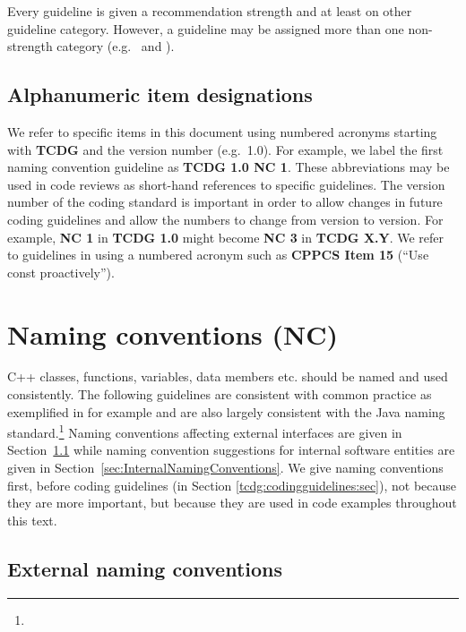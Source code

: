 Every guideline is given a recommendation strength and at least on
other guideline category.  However, a guideline may be assigned more
than one non-strength category (e.g.\ \InteropGC{} and \SafeGC).

%
\subsection{Alphanumeric item designations}
\label{sec:alpha_numeric_designations}
%

We refer to specific items in this document using numbered acronyms
starting with \textbf{TCDG} and the version number (e.g.\ 1.0).  For
example, we label the first naming convention guideline as
\textbf{TCDG 1.0 NC 1}.  These abbreviations may be used in code
reviews as short-hand references to specific guidelines.  The version
number of the coding standard is important in order to allow changes
in future coding guidelines and allow the numbers to change from
version to version.  For example, \textbf{NC 1} in \textbf{TCDG
  1.0} might become \textbf{NC 3} in \textbf{TCDG X.Y}.  We refer
to guidelines in \cite{C++CodingStandards05} using a numbered
acronym such as \textbf{CPPCS Item 15} (``Use const proactively'').


%
\section{Naming conventions (NC)}
\label{sec:NamingConventions}
%

C++ classes, functions, variables, data members etc. should be named
and used consistently.  The following guidelines are consistent with
common practice as exemplified in {}\cite{EffectiveC++3rd05} for
example and are also largely consistent with the Java naming
standard.\footnote{
  {}}
Naming conventions affecting external interfaces are given in
Section~\ref{sec:ExternalNamingConventions} while naming convention
suggestions for internal software entities are given in
Section~\ref{sec:InternalNamingConventions}.  We give naming
conventions first, before coding guidelines (in Section
\ref{tcdg:codingguidelines:sec}), not because they are more important,
but because they are used in code examples throughout this text.


%
\subsection{External naming conventions}
\label{sec:ExternalNamingConventions}
%


